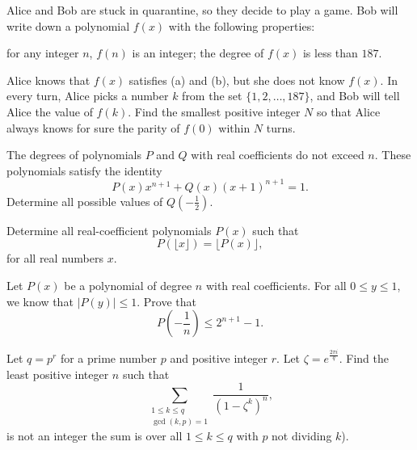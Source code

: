 \begin{question}[name={2020 Taiwan TST}]
    Alice and Bob are stuck in quarantine, so they decide to play a game. Bob will write down a polynomial $f(x)$ with the following properties:
    \begin{tasks}
        \task for any integer $n$, $f(n)$ is an integer;
        \task the degree of $f(x)$ is less than $187$.
    \end{tasks}
    Alice knows that $f(x)$ satisfies (a) and (b), but she does not know $f(x)$. In every turn, Alice picks a number $k$ from the set $\{1,2,\ldots,187\}$, and Bob will tell Alice the value of $f(k)$. Find the smallest positive integer $N$ so that Alice always knows for sure the parity of $f(0)$ within $N$ turns.
\end{question}


\begin{question}[name={2020 Tuymaada}]
    The degrees of polynomials $P$ and $Q$ with real coefficients do not exceed $n$. These polynomials satisfy the identity \[ P(x) x^{n + 1} + Q(x) (x+1)^{n + 1} = 1.\] Determine all possible values of $Q \left( - \frac{1}{2} \right)$.
\end{question}


\begin{question}[name={2020 Indonesia}]
    Determine all real-coefficient polynomials $P(x)$ such that
    \[ P(\lfloor x \rfloor) = \lfloor P(x) \rfloor,\] for all real numbers $x$.
\end{question}


\begin{question}[name={2019 Latvian TST for Balkan}]
Let $P(x)$ be a polynomial of degree $n$ with real coefficients. For all $0 \leq y \leq 1$, we know that $|P(y)| \leq 1$. Prove that \[P\left(-\frac{1}{n}\right) \leq 2^{n+1} -1.\]
\end{question}


\begin{question}[name={2021 USA TSTST}]
    Let $q=p^r$ for a prime number $p$ and positive integer $r$. Let $\zeta = e^{\frac{2\pi i}{q}}$. Find the least positive integer $n$ such that \[\sum_{\substack{1\leq k\leq q\\ \gcd(k,p)=1}} \frac{1}{(1-\zeta^k)^n},\] is not an integer the sum is over all $1\leq k\leq q$ with $p$ not dividing $k$).
\end{question}




